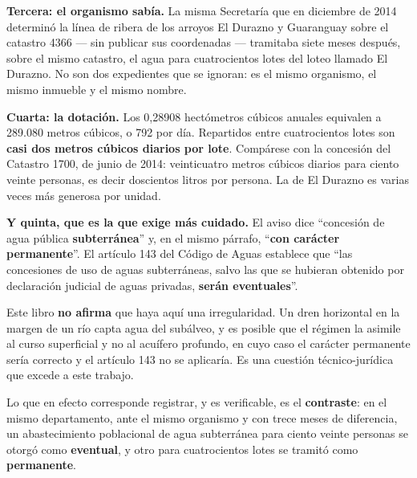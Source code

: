 \begin{cautela}
\textbf{Tercera: el organismo sabía.} La misma Secretaría que en diciembre de 2014 determinó la línea de ribera de los arroyos El Durazno y Guaranguay sobre el catastro 4366 --- sin publicar sus coordenadas --- tramitaba siete meses después, sobre el mismo catastro, el agua para cuatrocientos lotes del loteo llamado El Durazno. No son dos expedientes que se ignoran: es el mismo organismo, el mismo inmueble y el mismo nombre.

\textbf{Cuarta: la dotación.} Los 0,28908 hectómetros cúbicos anuales equivalen a 289.080 metros cúbicos, o 792 por día. Repartidos entre cuatrocientos lotes son \textbf{casi dos metros cúbicos diarios por lote}. Compárese con la concesión del Catastro 1700, de junio de 2014: veinticuatro metros cúbicos diarios para ciento veinte personas, es decir doscientos litros por persona. La de El Durazno es varias veces más generosa por unidad.

\textbf{Y quinta, que es la que exige más cuidado.} El aviso dice ``concesión de agua pública \textbf{subterránea}'' y, en el mismo párrafo, ``\textbf{con carácter permanente}''. El artículo 143 del Código de Aguas establece que ``las concesiones de uso de aguas subterráneas, salvo las que se hubieran obtenido por declaración judicial de aguas privadas, \textbf{serán eventuales}''.

Este libro \textbf{no afirma} que haya aquí una irregularidad. Un dren horizontal en la margen de un río capta agua del subálveo, y es posible que el régimen la asimile al curso superficial y no al acuífero profundo, en cuyo caso el carácter permanente sería correcto y el artículo 143 no se aplicaría. Es una cuestión técnico-jurídica que excede a este trabajo.

Lo que en efecto corresponde registrar, y es verificable, es el \textbf{contraste}: en el mismo departamento, ante el mismo organismo y con trece meses de diferencia, un abastecimiento poblacional de agua subterránea para ciento veinte personas se otorgó como \textbf{eventual}, y otro para cuatrocientos lotes se tramitó como \textbf{permanente}.
\end{cautela}

